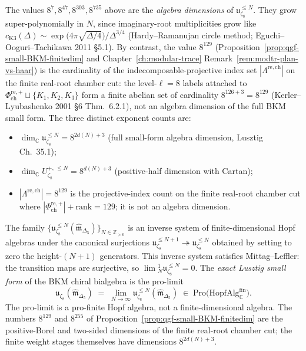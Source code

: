 \begin{remark}
\label{rem:qgf-129-vs-7-47-303-735}
The values $8^7, 8^{47}, 8^{303}, 8^{735}$ above are the
\emph{algebra dimensions} of $\mathfrak u_{\zeta_8}^{\le N}$. They grow
super-polynomially in $N$, since imaginary-root multiplicities grow
like $c_{\mathrm K3}(\Delta)\sim
\exp\!\bigl(4\pi\sqrt{\Delta/4}\bigr)/\Delta^{3/4}$
(Hardy--Ramanujan circle method;
Eguchi--Ooguri--Tachikawa 2011 \S5.1). By contrast, the value
$8^{129}$ (Proposition~\ref{prop:qgf-small-BKM-finitedim} and
Chapter~\ref{ch:modular-trace}
Remark~\ref{rem:modtr-plan-vs-haar}) is the cardinality of the
indecomposable-projective index set \(|\Lambda^{\mathrm{re,ch}}|\) on
the finite real-root chamber cut: the level-$\ell = 8$ labels attached
to
\(\Phi^{\mathrm{re},+}_{\mathrm{ch}}\sqcup\{K_1,K_2,K_3\}\)
form a finite abelian set of cardinality \(8^{126+3}=8^{129}\)
(Kerler--Lyubashenko 2001 \S6 Thm.~6.2.1), not an algebra dimension of
the full BKM small form. The three distinct exponent counts are:
\begin{itemize}
 \item $\dim_{\mathbb C}\mathfrak u_{\zeta_8}^{\le N} = 8^{2d(N)+3}$
 (full small-form algebra dimension, Lusztig Ch.~35.1);
 \item $\dim_{\mathbb C}U^{+,\,\le N}_{\zeta_8} = 8^{d(N)+3}$
 (positive-half dimension with Cartan);
 \item \(|\Lambda^{\mathrm{re,ch}}| = 8^{129}\)
 is the projective-index count on the finite real-root chamber cut
 where \(|\Phi^{\mathrm{re},+}_{\mathrm{ch}}|+\mathrm{rank}=129\);
 it is not an algebra dimension.
\end{itemize}
\end{remark}

\begin{theorem}
\label{thm:qgf-pbw-pro-limit}
The family $\{\mathfrak u_{\zeta_8}^{\leq N}(\widehat{\mathfrak m}_{\Delta_5})
\}_{N\in\mathbb Z_{>0}}$ is an inverse system of finite-dimensional
Hopf algebras under the canonical surjections
$\mathfrak u_{\zeta_8}^{\leq N+1}\twoheadrightarrow
\mathfrak u_{\zeta_8}^{\leq N}$ obtained by setting to zero the
height-$(N{+}1)$ generators. This inverse system satisfies
Mittag--Leffler: the transition maps are surjective, so
$\lim{}^{\!1}_N\mathfrak u_{\zeta_8}^{\leq N}=0$.
The \emph{exact Lusztig small form} of the BKM chiral bialgebra is the
pro-limit
\[
 \boxed{\;
 \mathfrak u_{\zeta_8}(\widehat{\mathfrak m}_{\Delta_5})
 \;=\;
 \lim_{N\to\infty}
 \mathfrak u_{\zeta_8}^{\leq N}(\widehat{\mathfrak m}_{\Delta_5})
 \;\in\; \mathrm{Pro}\bigl(\mathrm{HopfAlg}^{\mathrm{fin}}_{\mathbb C}\bigr).
 \;}
\]
The pro-limit is a pro-finite Hopf algebra, not a finite-dimensional
algebra. The numbers \(8^{129}\) and \(8^{255}\) of
Proposition~\ref{prop:qgf-small-BKM-finitedim} are the positive-Borel
and two-sided dimensions of the finite real-root chamber cut; the
finite weight stages themselves have dimensions \(8^{2d(N)+3}\).
\end{theorem}


